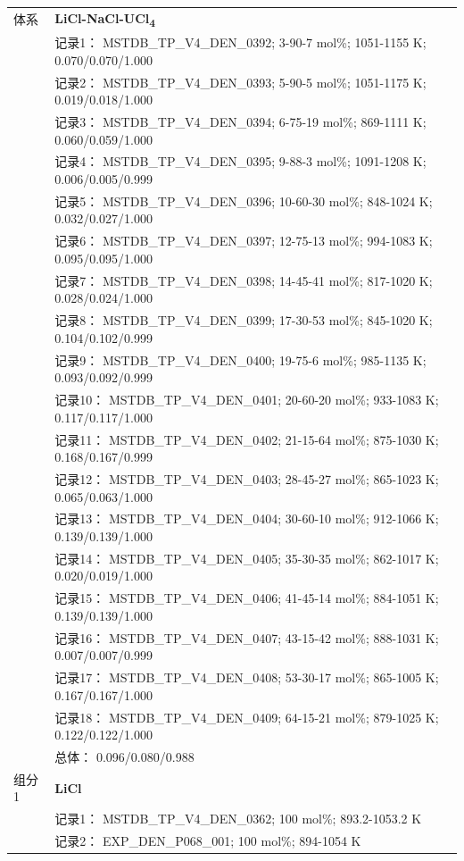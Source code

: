 \documentclass[12pt]{article}
\begin{document}
{\begin{longtable}[]{@{}
  >{\raggedright\arraybackslash}p{}
  >{\raggedright\arraybackslash}p{}@{}}
\midrule
体系 & \textbf{LiCl-NaCl-UCl\textsubscript{4}} \\
 & 记录1： MSTDB\_TP\_V4\_DEN\_0392; 3-90-7 mol\%; 1051-1155 K; 0.070/0.070/1.000 \\
 & 记录2： MSTDB\_TP\_V4\_DEN\_0393; 5-90-5 mol\%; 1051-1175 K; 0.019/0.018/1.000 \\
 & 记录3： MSTDB\_TP\_V4\_DEN\_0394; 6-75-19 mol\%; 869-1111 K; 0.060/0.059/1.000 \\
 & 记录4： MSTDB\_TP\_V4\_DEN\_0395; 9-88-3 mol\%; 1091-1208 K; 0.006/0.005/0.999 \\
 & 记录5： MSTDB\_TP\_V4\_DEN\_0396; 10-60-30 mol\%; 848-1024 K; 0.032/0.027/1.000 \\
 & 记录6： MSTDB\_TP\_V4\_DEN\_0397; 12-75-13 mol\%; 994-1083 K; 0.095/0.095/1.000 \\
 & 记录7： MSTDB\_TP\_V4\_DEN\_0398; 14-45-41 mol\%; 817-1020 K; 0.028/0.024/1.000 \\
 & 记录8： MSTDB\_TP\_V4\_DEN\_0399; 17-30-53 mol\%; 845-1020 K; 0.104/0.102/0.999 \\
 & 记录9： MSTDB\_TP\_V4\_DEN\_0400; 19-75-6 mol\%; 985-1135 K; 0.093/0.092/0.999 \\
 & 记录10： MSTDB\_TP\_V4\_DEN\_0401; 20-60-20 mol\%; 933-1083 K; 0.117/0.117/1.000 \\
 & 记录11： MSTDB\_TP\_V4\_DEN\_0402; 21-15-64 mol\%; 875-1030 K; 0.168/0.167/0.999 \\
 & 记录12： MSTDB\_TP\_V4\_DEN\_0403; 28-45-27 mol\%; 865-1023 K; 0.065/0.063/1.000 \\
 & 记录13： MSTDB\_TP\_V4\_DEN\_0404; 30-60-10 mol\%; 912-1066 K; 0.139/0.139/1.000 \\
 & 记录14： MSTDB\_TP\_V4\_DEN\_0405; 35-30-35 mol\%; 862-1017 K; 0.020/0.019/1.000 \\
 & 记录15： MSTDB\_TP\_V4\_DEN\_0406; 41-45-14 mol\%; 884-1051 K; 0.139/0.139/1.000 \\
 & 记录16： MSTDB\_TP\_V4\_DEN\_0407; 43-15-42 mol\%; 888-1031 K; 0.007/0.007/0.999 \\
 & 记录17： MSTDB\_TP\_V4\_DEN\_0408; 53-30-17 mol\%; 865-1005 K; 0.167/0.167/1.000 \\
 & 记录18： MSTDB\_TP\_V4\_DEN\_0409; 64-15-21 mol\%; 879-1025 K; 0.122/0.122/1.000 \\
 & 总体： 0.096/0.080/0.988  \\

组分 1  & \textbf{LiCl} \\
 & 记录1： MSTDB\_TP\_V4\_DEN\_0362; 100 mol\%; 893.2-1053.2 K \\
 & 记录2： EXP\_DEN\_P068\_001; 100 mol\%; 894-1054 K  \\


\end{longtable}}
\end{document}
